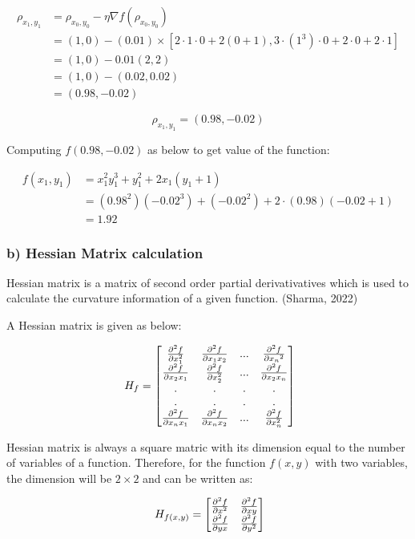 \documentclass[a4paper]{report}
\begin{document}
\begin{align*}
\rho_{x_1,y_1} &= \rho_{x_0,y_0} - \eta \nabla f(\rho_{x_0,y_0}) \\
&=(1,0)-(0.01)\times [2 \cdot 1 \cdot 0 + 2(0+1), 3 \cdot (1^3)\cdot 0 + 2\cdot 0+2\cdot 1] \\
&=(1,0) - 0.01 (2,2) \\
&= (1,0) - (0.02, 0.02) \\
&=(0.98, -0.02)
\end{align*}

\begin{equation}
    \rho_{x_1,y_1} = (0.98, -0.02)
\end{equation}


Computing $f(0.98,-0.02)$ as below to get value of the function:

\begin{align*}
f(x_1,y_1)&= x_1^2 y_1^3+y_1^2+2x_1(y_1+1) \\
&=(0.98^2)(-0.02^3)+(-0.02^2)+2\cdot (0.98)(-0.02+1) \\
&=1.92
\end{align*}


\subsubsection*{b) Hessian Matrix calculation}

Hessian matrix is a matrix of second order partial derivativatives which is used to calculate the curvature information of a given function. (Sharma, 2022)

A Hessian matrix is given as below:

\[\ H_f=
\begin{bmatrix}
    \frac{\partial{^2f}}{\partial{x_1^2}} & \frac{\partial{^2f}}{\partial{x_1x_2}} & ... & \frac{\partial^2{f}}{\partial{x_n}^2} \\
    \frac{\partial{^2f}}{\partial{x_2x_1}} & \frac{\partial{^2f}}{\partial{x_2^2}} & ... & \frac{\partial{^2f}}{\partial{x_2x_n}} \\
    .&.&.&. \\
    .&.&.&. \\
    \frac{\partial{^2f}}{\partial{x_nx_1}} & \frac{\partial{^2f}}{\partial{x_nx_2}} & ... & \frac{\partial{^2f}}{\partial{x_n^2}} \\
    
\end{bmatrix} \]

Hessian matrix is always a square matric with its dimension equal to the number of variables of a function. Therefore, for the function $f(x,y)$ with two variables, the dimension will be $2\times 2$ and can be written as:

\[\ H_{f(x,y)} =
\begin{bmatrix}
    \frac{\partial{^2f}}{\partial{x^2}} & \frac{\partial{^2f}}{\partial{xy}} \\
    \frac{\partial{^2f}}{\partial{yx}} & \frac{\partial{^2f}}{\partial{y^2}}     
\end{bmatrix} \]
\end{document}
